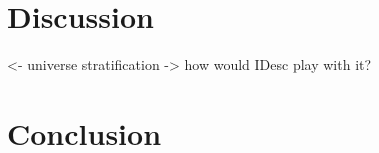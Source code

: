 \documentclass[preprint, authoryear]{sigplanconf}
\newenvironment{structure}{\footnotesize\verbatim}{\endverbatim}
\begin{document}

\section{Discussion}

\begin{structure}
<- universe stratification
    -> how would IDesc play with it?
\end{structure}



\section{Conclusion}

\begin{structure}
\end{structure}















\end{document}
